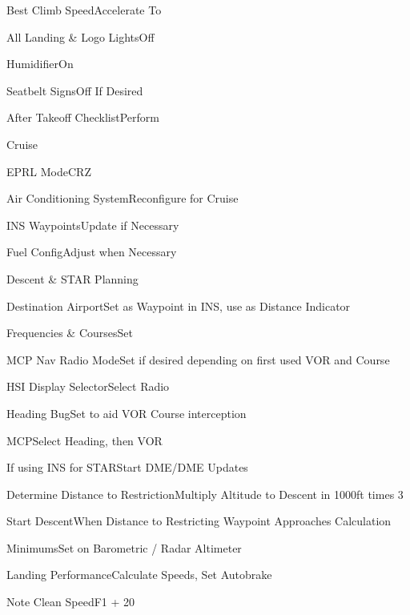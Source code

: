 \documentclass[sim-use, blue_items]{checklist}
\begin{document}
\begin{continuedchecklist}
	 {
		\item{Best Climb Speed}{Accelerate To}
		\item{All Landing \& Logo Lights}{Off}
		\item{Humidifier}{On}
		\item{Seatbelt Signs}{Off If Desired}
		\item{After Takeoff Checklist}{Perform}
	}
\end{continuedchecklist}

\begin{checklist}{Cruise}
	 {
		\item{EPRL Mode}{CRZ}
		\item{Air Conditioning System}{Reconfigure for Cruise}
	}
	\item{INS Waypoints}{Update if Necessary}
	\item{Fuel Config}{Adjust when Necessary}
\end{checklist}

\begin{checklist}{Descent \& STAR Planning}
	\item{Destination Airport}{Set as Waypoint in INS, use as Distance Indicator}
	 {
		\item{Frequencies \& Courses}{Set}
		\item{MCP Nav Radio Mode}{Set if desired depending on first used VOR and Course}
		\item{HSI Display Selector}{Select Radio}
		\item{Heading Bug}{Set to aid VOR Course interception}
		\item{MCP}{Select Heading, then VOR}
	}
	\item{If using INS for STAR}{Start DME/DME Updates}
	 {
		\item{Determine Distance to Restriction}{Multiply Altitude to Descent in 1000ft times 3}
		\item{Start Descent}{When Distance to Restricting Waypoint Approaches Calculation}
	}
	\item{Minimums}{Set on Barometric / Radar Altimeter}
	\item{Landing Performance}{Calculate Speeds, Set Autobrake}
	\item{Note Clean Speed}{F1 + 20}
\end{checklist}
\end{document}
